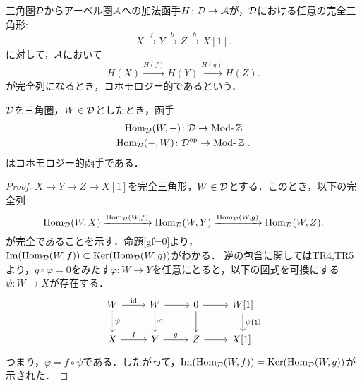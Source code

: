 \begin{defn}\cite[p.245]{KS06}
	三角圏${\mathcal D}$からアーベル圏${\mathcal A}$への加法函手$H\colon {\mathcal D}\to{\mathcal A}$が，${\mathcal D}$における任意の完全三角形:
	\[X\xrightarrow{f}Y\xrightarrow{g}Z\xrightarrow{h}X[1].\]
	に対して，${\mathcal A}$において
	\[H(X)\xrightarrow{H(f)}H(Y)\xrightarrow{H(g)}H(Z).\]
	が完全列になるとき，コホモロジー的であるという．
\end{defn}

\begin{prop}\cite[p.245]{KS06}
	${\mathcal D}$を三角圏，$W\in {\mathcal D}$としたとき，函手
	\begin{gather*}
		\Hom_{\D}(W,-)\colon \D\to\Mod\ZZ \\
		\Hom_{\D}(-,W)\colon \D^{\mathrm{op}}\to\Mod\ZZ\ .
	\end{gather*}
	はコホモロジー的函手である．
\end{prop}
\begin{proof}
	$X\rightarrow Y \rightarrow Z\rightarrow X[1]$を完全三角形，$W\in{\mathcal D}$とする．このとき，以下の完全列
	\[\operatorname{\mathrm{Hom}}_{{\mathcal D}}(W,X)\xrightarrow{\operatorname{\mathrm{Hom}}_{{\mathcal D}}(W,f)}\operatorname{\mathrm{Hom}}_{{\mathcal D}}(W,Y)\xrightarrow{\operatorname{\mathrm{Hom}}_{{\mathcal D}}(W,g)}\operatorname{\mathrm{Hom}}_{{\mathcal D}}(W,Z).\]
	が完全であることを示す．命題\ref{gf=0}より，$\Im(\operatorname{\mathrm{Hom}}_{{\mathcal D}}(W,f))\subset \operatorname{Ker}(\operatorname{\mathrm{Hom}}_{{\mathcal D}}(W,g))$がわかる．
	逆の包含に関してはTR4,TR5より，$g\circ\varphi = 0$をみたす$\varphi\colon W\to Y$を任意にとると，以下の図式を可換にする$\psi\colon W\to X$が存在する．
		\[
\begin{tikzcd}
	W\ar[r,"\id"]\ar[d,dotted,"\psi"]&W \ar[r]\ar[d,"\varphi"]& 0\ar[r]\ar[d]& W[1]\ar[d,"\psi\texttt{[1]}"]\\
	X\ar[r,"f"]&Y \ar[r,"g"]& Z\ar[r]& X[1].
\end{tikzcd}
	\]
つまり，$\varphi = f\circ\psi$である．したがって，$\Im(\operatorname{\mathrm{Hom}}_{{\mathcal D}}(W,f))= \operatorname{Ker}(\operatorname{\mathrm{Hom}}_{{\mathcal D}}(W,g))$が示された．
\end{proof}



